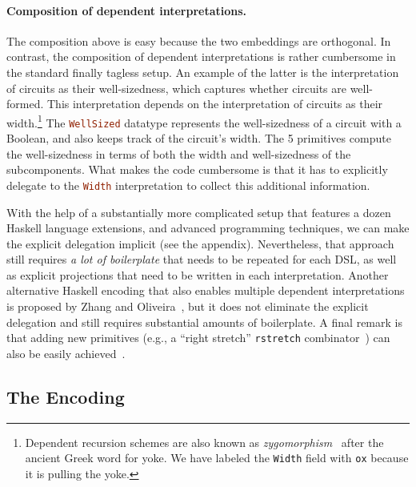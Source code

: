 \paragraph{Composition of dependent interpretations.}

The composition above is easy because the two embeddings are
orthogonal. In contrast, the composition of dependent interpretations is
rather cumbersome in the standard finally tagless setup. An example of the
latter is the interpretation of circuits as their well-sizedness, which
captures whether circuits are well-formed. This interpretation depends on the
interpretation of circuits as their width.\footnote{Dependent recursion schemes
are also known as \emph{zygomorphism}~\cite{fokkinga1989tupling} after the ancient Greek word \emph{\textzeta\textupsilon\textgamma\textomikron\textnu}
for yoke. We have labeled the \lstinline{Width} field with \lstinline{ox} because it is pulling the yoke.}
The \lstinline[language=haskell]{WellSized} datatype represents the well-sizedness of a circuit with
a Boolean, and also keeps track of the circuit's width. The 5 primitives
compute the well-sizedness in terms of both the width and well-sizedness of the subcomponents.
What makes the code cumbersome is that it has to explicitly delegate to the \lstinline[language=haskell]{Width}
interpretation to collect this additional information.

With the help of a substantially more complicated setup that features a dozen
Haskell language extensions, and advanced programming techniques, we can make
the explicit delegation implicit (see the appendix). Nevertheless,
that approach still requires \emph{a lot of boilerplate} that needs to be repeated for
each DSL, as well as explicit projections that need to be written in each
interpretation. Another alternative Haskell encoding that also enables
multiple dependent interpretations is proposed by Zhang and Oliveira~\cite{zhang19shallow},
but it does not eliminate the explicit delegation and still requires
substantial amounts of boilerplate.
A final remark is that adding new primitives (e.g.,
a ``right stretch'' \lstinline{rstretch}
combinator~\cite{hinze2004algebra}) can also be easily 
achieved~\cite{emgm}.

 
\subsection{The \sedel Encoding}

